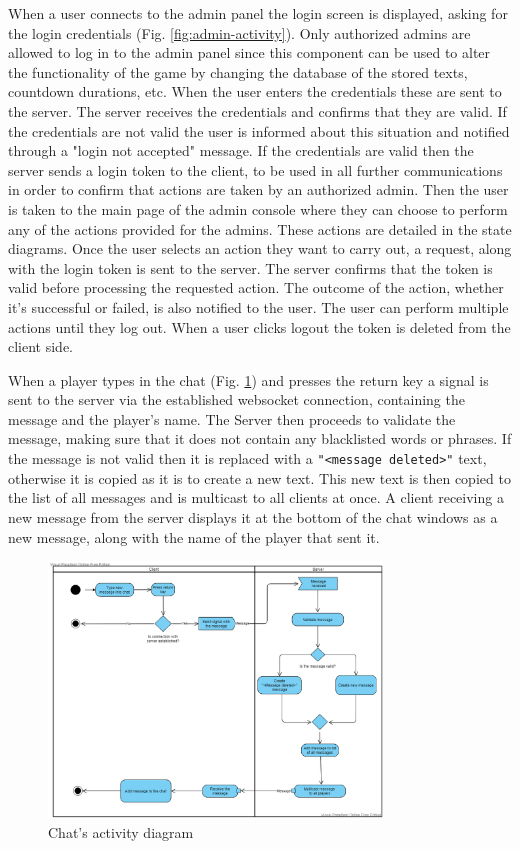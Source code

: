 \documentclass[titlepage]{article}
\newcommand{\figref}[1]{{(Fig. \hypersetup{linkcolor=blue}\ref{#1})}}
\begin{document}
When a user connects to the admin panel the login screen is displayed, asking for the login credentials \figref{fig:admin-activity}. Only authorized admins are allowed to log in to the admin panel since this component can be used to alter the functionality of the game by changing the database of the stored texts, countdown durations, etc. When the user enters the credentials these are sent to the server. The server receives the credentials and confirms that they are valid. If the credentials are not valid the user is informed about this situation and notified through a "login not accepted" message. If the credentials are valid then the server sends a login token to the client, to be used in all further communications in order to confirm that actions are taken by an authorized admin. Then the user is taken to the main page of the admin console where they can choose to perform any of the actions provided for the admins. These actions are detailed in the state diagrams. Once the user selects an action they want to carry out, a request, along with the login token is sent to the server. The server confirms that the token is valid before processing the requested action. The outcome of the action, whether it's successful or failed, is also notified to the user. The user can perform multiple actions until they log out. When a user clicks logout the token is deleted from the client side.


When a player types in the chat \figref{fig:chat-activity} and presses the return key a signal is sent to the server via the established websocket connection, containing the message and the player's name. The Server then proceeds to validate the message, making sure that it does not contain any blacklisted words or phrases. If the message is not valid then it is replaced with a \texttt{"<message deleted>"} text, otherwise it is copied as it is to create a new text. This new text is then copied to the list of all messages and is multicast to all clients at once. A client receiving a new message from the server displays it at the bottom of the chat windows as a new message, along with the name of the player that sent it.

\begin{figure}[H]
	\centering
	\includegraphics[width=0.79\textwidth]{activity_diagram_chat.png}
	\caption{Chat's activity diagram}
	\label{fig:chat-activity}
\end{figure}
\end{document}
